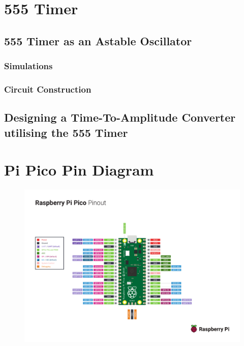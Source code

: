 \documentclass[%
 reprint,
 amsmath,amssymb,
 aps,
]{revtex4-2}
\begin{document}
\section{555 Timer}
    
    \subsection{555 Timer as an Astable Oscillator}

        \subsubsection{Simulations}

        \subsubsection{Circuit Construction}


    \subsection{Designing a Time-To-Amplitude Converter utilising the 555 Timer}


\clearpage


\clearpage
\onecolumngrid
\appendix

\section{Pi Pico Pin Diagram}

    \begin{figure}[h]
        \includegraphics[width=\columnwidth]{Images/Pico-R3-A4-Pinout.pdf}
    \end{figure}
\end{document}
